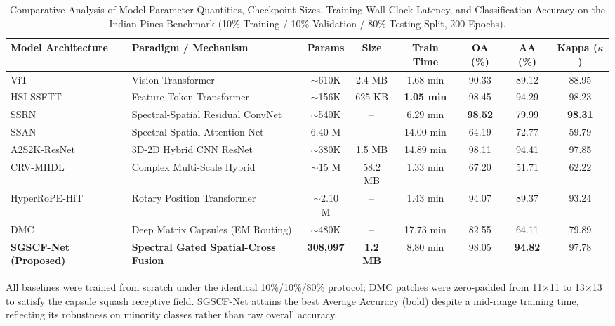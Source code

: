 \documentclass[manuscript,screen,review]{acmart}
\begin{document}
\begin{table}[t]
\centering
\footnotesize
\caption{Comparative Analysis of Model Parameter Quantities, Checkpoint Sizes, Training Wall-Clock Latency, and Classification Accuracy on the Indian Pines Benchmark (10\% Training / 10\% Validation / 80\% Testing Split, 200 Epochs).}
\label{tab:model_param_comparison}
\begin{tabular*}{\textwidth}{@{\extracolsep{\fill}}llcccccc}
\toprule
\textbf{Model Architecture} & \textbf{Paradigm / Mechanism} & \textbf{Params} & \textbf{Size} & \textbf{Train Time} & \textbf{OA (\%)} & \textbf{AA (\%)} & \textbf{Kappa ($\kappa$)} \\
\midrule
ViT \cite{dosovitskiy2020image} & Vision Transformer & $\sim$610K & 2.4 MB & 1.68 min & 90.33 & 89.12 & 88.95 \\
HSI-SSFTT \cite{sun2022spectral} & Feature Token Transformer & $\sim$156K & 625 KB & \textbf{1.05 min} & 98.45 & 94.29 & 98.23 \\
SSRN \cite{zhong2017spectral} & Spectral-Spatial Residual ConvNet & $\sim$540K & -- & 6.29 min & \textbf{98.52} & 79.99 & \textbf{98.31} \\
SSAN \cite{sun2019spectral} & Spectral-Spatial Attention Net & 6.40 M & -- & 14.00 min & 64.19 & 72.77 & 59.79 \\
A2S2K-ResNet \cite{roy2020attention} & 3D-2D Hybrid CNN ResNet & $\sim$380K & 1.5 MB & 14.89 min & 98.11 & 94.41 & 97.85 \\
CRV-MHDL \cite{alalimi2022compression} & Complex Multi-Scale Hybrid & $\sim$15 M & 58.2 MB & 1.33 min & 67.20 & 51.71 & 62.22 \\
HyperRoPE-HiT \cite{khan2025hyperrope} & Rotary Position Transformer & $\sim$2.10 M & -- & 1.43 min & 94.07 & 89.37 & 93.24 \\
DMC \cite{wang2021deep} & Deep Matrix Capsules (EM Routing) & $\sim$480K & -- & 17.73 min & 82.55 & 64.11 & 79.89 \\
\midrule
\textbf{SGSCF-Net (Proposed)} & \textbf{Spectral Gated Spatial-Cross Fusion} & \textbf{308,097} & \textbf{1.2 MB} & 8.80 min & 98.05 & \textbf{94.82} & 97.78 \\
\bottomrule
\end{tabular*}
\flushleft
\footnotesize{All baselines were trained from scratch under the identical 10\%/10\%/80\% protocol; DMC patches were zero-padded from 11$\times$11 to 13$\times$13 to satisfy the capsule squash receptive field. SGSCF-Net attains the best Average Accuracy (bold) despite a mid-range training time, reflecting its robustness on minority classes rather than raw overall accuracy.}
\end{table}
\end{document}
